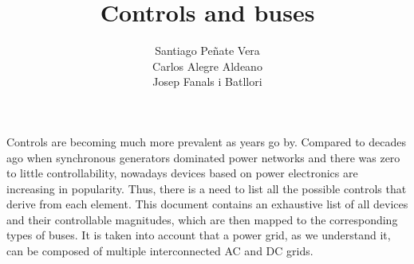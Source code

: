 \documentclass[11pt]{article}
\title{\textbf{Controls and buses}}
\author{Santiago Pe\~nate Vera \\ 
		Carlos Alegre Aldeano \\
		Josep Fanals i Batllori}
\begin{document}
	
	\maketitle
	
	Controls are becoming much more prevalent as years go by. Compared to decades ago when synchronous generators dominated power networks and there was zero to little controllability, nowadays devices based on power electronics are increasing in popularity. Thus, there is a need to list all the possible controls that derive from each element. This document contains an exhaustive list of all devices and their controllable magnitudes, which are then mapped to the corresponding types of buses. It is taken into account that a power grid, as we understand it, can be composed of multiple interconnected AC and DC grids.  
\end{document}
